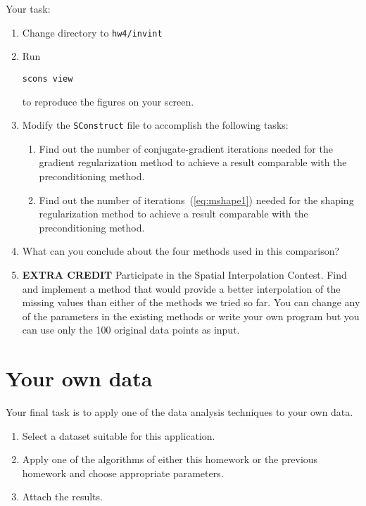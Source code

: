 Your task:
\begin{enumerate}
\item Change directory to \texttt{hw4/invint}
\item Run 
\begin{verbatim}
scons view
\end{verbatim}
to reproduce the figures on your screen.
\item Modify the \texttt{SConstruct} file to accomplish the following
  tasks:
\begin{enumerate}
\item Find out 
the number of conjugate-gradient iterations needed for the gradient regularization method to achieve a result 
 comparable with the preconditioning method.
\item Find out 
the number of iterations~(\ref{eq:mshape1}) needed for the shaping regularization method to achieve a result 
 comparable with the preconditioning method.
\end{enumerate}
\item What can you conclude about the four methods used in this comparison?
\item \textbf{EXTRA CREDIT} Participate in the Spatial Interpolation Contest. Find and
implement a method that would provide a better interpolation of the
missing values than either of the methods we tried so far. You can
change any of the parameters in the existing methods or write your own
program but you can use only the 100 original data points as input.
\end{enumerate}

\lstset{language=c,numbers=left,numberstyle=\tiny,showstringspaces=false}


\lstset{language=python,numbers=left,numberstyle=\tiny,showstringspaces=false}


\section{Your own data}

Your final task is to apply one of the data analysis techniques to your own data.
\begin{enumerate}
\item Select a dataset suitable for this application.
\item Apply one of the algorithms of either this homework or the previous homework and choose appropriate parameters.
\item Attach the results.
\end{enumerate}

